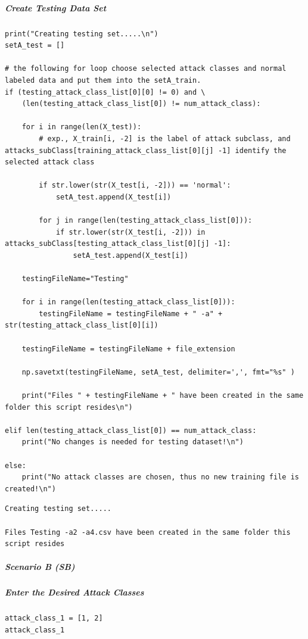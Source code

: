 \subparagraph{Create Testing Data Set}

\begin{verbatim}
print("Creating testing set.....\n")    
setA_test = []

# the following for loop choose selected attack classes and normal labeled data and put them into the setA_train.
if (testing_attack_class_list[0][0] != 0) and \
    (len(testing_attack_class_list[0]) != num_attack_class):

    for i in range(len(X_test)):
        # exp., X_train[i, -2] is the label of attack subclass, and attacks_subClass[training_attack_class_list[0][j] -1] identify the selected attack class

        if str.lower(str(X_test[i, -2])) == 'normal':
            setA_test.append(X_test[i])

        for j in range(len(testing_attack_class_list[0])):
            if str.lower(str(X_test[i, -2])) in attacks_subClass[testing_attack_class_list[0][j] -1]:
                setA_test.append(X_test[i])

    testingFileName="Testing"

    for i in range(len(testing_attack_class_list[0])):
        testingFileName = testingFileName + " -a" + str(testing_attack_class_list[0][i])

    testingFileName = testingFileName + file_extension

    np.savetxt(testingFileName, setA_test, delimiter=',', fmt="%s" )

    print("Files " + testingFileName + " have been created in the same folder this script resides\n")

elif len(testing_attack_class_list[0]) == num_attack_class:
    print("No changes is needed for testing dataset!\n")

else:
    print("No attack classes are chosen, thus no new training file is created!\n")
\end{verbatim}

\begin{verbatim}
Creating testing set.....

Files Testing -a2 -a4.csv have been created in the same folder this script resides
\end{verbatim}

\subparagraph{Scenario B (SB)}

\subparagraph{Enter the Desired Attack Classes}

\begin{verbatim}
attack_class_1 = [1, 2]
attack_class_1
\end{verbatim}

